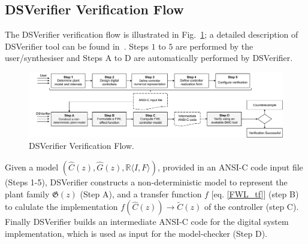 \documentclass{sig-alternate-05-2015}
\newcommand{\red}[1]{{\color{red}#1}}
\begin{document}
\subsection{DSVerifier Verification Flow}
\label{verification-flow}


The DSVerifier verification flow is illustrated in Fig.~\ref{DSVerifier_process};
a detailed description of DSVerifier tool can be found in~\cite{IsmailBCFF15}.
Steps $1$ to $5$ are performed by the user/synthesiser and
Steps A to D are automatically performed by DSVerifier.

\begin{figure}[t]
\centering
\includegraphics[width=\textwidth]{figures/verification-flow.pdf}
\caption{DSVerifier Verification Flow.}
\label{DSVerifier_process}
\end{figure}


Given a model $(\hat{C}(z),\hat{G}(z), \mathbb{R}\langle I,F \rangle)$,
provided in an ANSI-C code input file (Steps 1-5), DSVerifier constructs a
non-deterministic model to represent the plant family $\mathfrak{G}(z)$
(Step A), and a transfer function $f$ [eq.  \ref{FWL_tf}] (step B) to
calulate the implementation $f(\hat{C}(z)) \rightarrow \tilde C(z)$ of the
controller (step C).  Finally DSVerifier builds an intermediate ANSI-C code
for the digital system implementation, which is used as input for the
model-checker (Step D).
\end{document}
